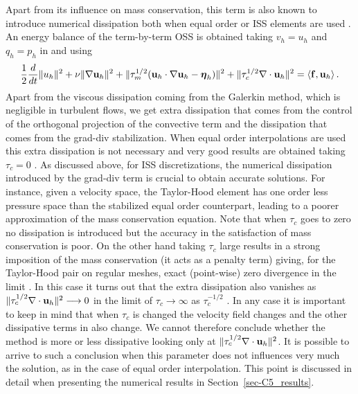 Apart from its influence on mass conservation, this term is also known to introduce numerical dissipation both when equal order \cite{colomes_assessment_2015} or ISS elements are used \cite{olshanskii_graddiv_2009}. An energy balance of the term-by-term OSS is obtained taking $v_h=u_h$ and $q_h=p_h$ in  and using 
\begin{equation}
\label{eq-C5_ene_total}
\frac{1}{2}\frac{d}{dt}\|u_h\|^2+\nu\|\nabla{\bf u}_h\|^2
+\|\tau_m^{1/2}({\bf u}_h\cdot\nabla{\bf u}_h-\boldsymbol{\eta}_h)\|^2+ \|\tau_c^{1/2}\nabla\cdot{\bf u}_h\|^2
=\left<{\bf f},{\bf u}_h\right>.
\end{equation}
Apart from the viscous dissipation coming from the Galerkin method, which is negligible in turbulent flows, we get extra dissipation that comes from the control of the orthogonal projection of the convective term and the dissipation that comes from the grad-div stabilization. When equal order interpolations are used this extra dissipation is not necessary and very good results are obtained taking $\tau_c=0$ \cite{colomes_assessment_2015}. As discussed above, for ISS discretizations, the numerical dissipation introduced by the grad-div term is crucial to obtain accurate solutions. For instance, given a velocity space, the Taylor-Hood element has one order less pressure space than the stabilized equal order counterpart, leading to a poorer approximation of the mass conservation equation. 
Note that when $\tau_c$ goes to zero no dissipation is introduced but the accuracy in the satisfaction of mass conservation is poor.
On the other hand taking $\tau_c$ large results in a strong imposition of the mass conservation (it acts as a penalty term) giving, for the Taylor-Hood pair on regular meshes, exact (point-wise) zero divergence in the limit \cite{case_connection_2011}. In this case it turns out that the extra dissipation also vanishes as $\|\tau_c^{1/2}\nabla\cdot{\bf u}_h\|^2 \longrightarrow 0$ in the limit of $\tau_c \longrightarrow \infty$ as $\tau_c^{-1/2}$ \cite{linke_convergence_2011}. In any case it is important to keep in mind that when $\tau_c$ is changed the velocity field changes and the other dissipative terms in  also change. We cannot therefore conclude whether the method is more or less dissipative looking only at $\|\tau_c^{1/2}\nabla\cdot{\bf u}_h\|^2$. It is possible to arrive to such a conclusion when this parameter does not influences very much the solution, as in the case of equal order interpolation. This point is discussed in detail when presenting the numerical results in Section~\ref{sec-C5_results}.

